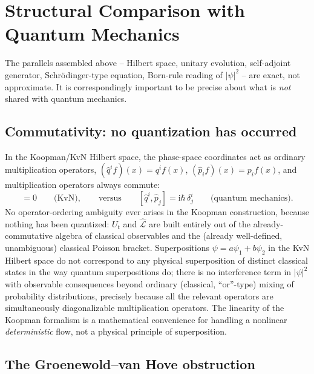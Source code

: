 \documentclass[11pt]{article}
\theoremstyle{remark}
\newcommand{\CL}{\widehat{\mathcal{L}}}
\newcommand{\ii}{\mathrm{i}}
\begin{document}
\section{Structural Comparison with Quantum Mechanics}
\label{sec:qm}

The parallels assembled above -- Hilbert space, unitary evolution, self-adjoint generator, Schr\"odinger-type equation, Born-rule reading of $|\psi|^2$ -- are exact, not approximate. It is correspondingly important to be precise about what is \emph{not} shared with quantum mechanics.

\subsection{Commutativity: no quantization has occurred}

In the Koopman/KvN Hilbert space, the phase-space coordinates act as ordinary multiplication operators, $(\hat q^if)(x)=q^if(x)$, $(\hat p_if)(x)=p_if(x)$, and multiplication operators always commute:
\begin{equation}
[\hat q^i,\hat p_j]=0 \qquad \text{(KvN)}, \qquad\text{versus}\qquad [\hat q^i,\hat p_j]=\ii\hbar\,\delta^i_j \qquad\text{(quantum mechanics).}
\end{equation}
No operator-ordering ambiguity ever arises in the Koopman construction, because nothing has been quantized: $U_t$ and $\CL$ are built entirely out of the already-commutative algebra of classical observables and the (already well-defined, unambiguous) classical Poisson bracket. Superpositions $\psi=a\psi_1+b\psi_2$ in the KvN Hilbert space do not correspond to any physical superposition of distinct classical states in the way quantum superpositions do; there is no interference term in $|\psi|^2$ with observable consequences beyond ordinary (classical, ``or''-type) mixing of probability distributions, precisely because all the relevant operators are simultaneously diagonalizable multiplication operators. The linearity of the Koopman formalism is a mathematical convenience for handling a nonlinear \emph{deterministic} flow, not a physical principle of superposition.

\subsection{The Groenewold--van Hove obstruction}
\end{document}
